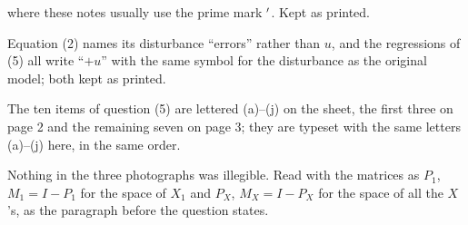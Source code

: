 \documentclass[11pt]{article}
\begin{document}
\begin{transcriptnotes}
        where these notes usually use the prime mark $^{\prime}$. Kept as printed.
  \item Equation (2) names its disturbance ``errors'' rather than $u$, and the
        regressions of (5) all write ``$+u$'' with the same symbol for the
        disturbance as the original model; both kept as printed.
  \item The ten items of question (5) are lettered (a)--(j) on the sheet, the
        first three on page 2 and the remaining seven on page 3; they are
        typeset with the same letters (a)--(j) here, in the same order.
  \item Nothing in the three photographs was illegible. Read with the matrices
        as $P_{1}$, $M_{1} = I - P_{1}$ for the space of $X_{1}$ and $P_{X}$,
        $M_{X} = I - P_{X}$ for the space of all the $X$'s, as the paragraph
        before the question states.
\end{transcriptnotes}
\end{document}
